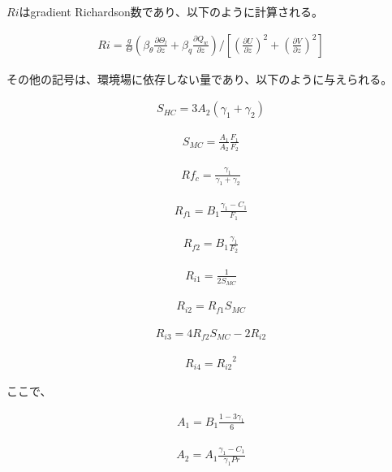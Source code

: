 \(Ri\)はgradient Richardson数であり、以下のように計算される。

\begin{eqnarray}Ri=\frac{g}{\Theta}\left(\beta_\theta \frac{\partial \Theta_l}{\partial z}+\beta_q \frac{\partial Q_w}{\partial z}\right) \Bigg/ \left[ \left(\frac{\partial U}{\partial z}\right)^2+\left(\frac{\partial V}{\partial z}\right)^2 \right]\end{eqnarray}

その他の記号は、環境場に依存しない量であり、以下のように与えられる。

\begin{eqnarray}S_{HC}=3A_2(\gamma_1+\gamma_2)\end{eqnarray}

\begin{eqnarray}S_{MC}=\frac{A_1}{A_2}\frac{F_1}{F_2}\end{eqnarray}

\begin{eqnarray}Rf_c=\frac{\gamma_1}{\gamma_1+\gamma_2}\end{eqnarray}

\begin{eqnarray}R_{f1}=B_1\frac{\gamma_1-C_1}{F_1}\end{eqnarray}

\begin{eqnarray}R_{f2}=B_1\frac{\gamma_1}{F_2}\end{eqnarray}

\begin{eqnarray}R_{i1}=\frac{1}{2S_{MC}}\end{eqnarray}

\begin{eqnarray}R_{i2}=R_{f1}S_{MC}\end{eqnarray}

\begin{eqnarray}R_{i3}=4R_{f2}S_{MC}-2R_{i2}\end{eqnarray}

\begin{eqnarray}R_{i4}={R_{i2}}^2\end{eqnarray}

ここで、

\begin{eqnarray}A_1=B_1\frac{1-3\gamma_1}{6}\end{eqnarray}

\begin{eqnarray}A_2=A_1\frac{\gamma_1-C_1}{\gamma_1 Pr}\end{eqnarray}

